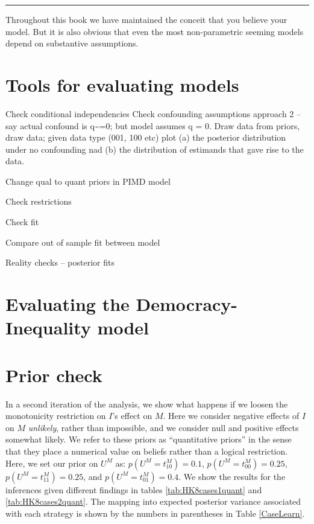\documentclass[12pt,]{book}
\begin{document}
\begin{center}\rule{0.5\linewidth}{\linethickness}\end{center}

Throughout this book we have maintained the conceit that you believe your model. But it is also obvious that even the most non-parametric seeming models depend on substantive assumptions.

\hypertarget{tools-for-evaluating-models}{%
\section{Tools for evaluating models}\label{tools-for-evaluating-models}}

Check conditional independencies
Check confounding assumptions approach 2 -- say actual confound is q\textasciitilde{}=0; but model assumes q = 0. Draw data from priors, draw data; given data type (001, 100 etc) plot (a) the posterior distribution under no confounding nad (b) the distribution of estimands that gave rise to the data.

Change qual to quant priors in PIMD model

Check restrictions

Check fit

Compare out of sample fit between model

Reality checks -- posterior fits

\hypertarget{evaluating-the-democracy-inequality-model}{%
\section{Evaluating the Democracy-Inequality model}\label{evaluating-the-democracy-inequality-model}}

\hypertarget{prior-check}{%
\section{Prior check}\label{prior-check}}

In a second iteration of the analysis, we show what happens if we loosen the monotonicity restriction on \(I\)'s effect on \(M\). Here we consider negative effects of \(I\) on \(M\) \emph{unlikely}, rather than impossible, and we consider null and positive effects somewhat likely. We refer to these priors as ``quantitative priors'' in the sense that they place a numerical value on beliefs rather than a logical restriction. Here, we set our prior on \(U^M\) as: \(p(U^M=t^M_{10})=0.1\), \(p(U^M=t^M_{00})=0.25\), \(p(U^M=t^M_{11})=0.25\), and \(p(U^M=t^M_{01})=0.4\). We show the results for the inferences given different findings in tables \ref{tab:HK8cases1quant} and \ref{tab:HK8cases2quant}. The mapping into expected posterior variance associated with each strategy is shown by the numbers in parentheses in Table \ref{CaseLearn}.
\end{document}
